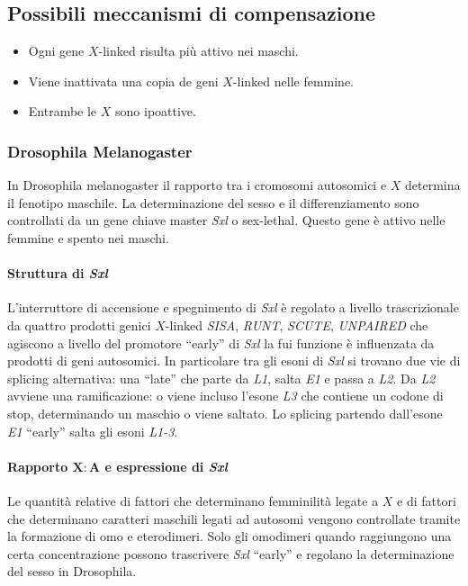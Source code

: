 	\subsection{Possibili meccanismi di compensazione}
	\begin{itemize}
		\item Ogni gene $X$-linked risulta pi\`u attivo nei maschi.
		\item Viene inattivata una copia de geni $X$-linked nelle femmine.
		\item Entrambe le $X$ sono ipoattive.
	\end{itemize}

		\subsubsection{Drosophila Melanogaster}
		In Drosophila melanogaster il rapporto tra i cromosomi autosomici e $X$ determina il fenotipo maschile.
		La determinazione del sesso e il differenziamento sono controllati da un gene chiave master \emph{Sxl} o sex-lethal.
		Questo gene \`e attivo nelle femmine e spento nei maschi.

			\paragraph{Struttura di \emph{Sxl}}
			L'interruttore di accensione e spegnimento di \emph{Sxl} \`e regolato a livello trascrizionale da quattro prodotti genici $X$-linked \emph{SISA}, \emph{RUNT}, \emph{SCUTE}, \emph{UNPAIRED} che agiscono a livello del promotore ``early'' di \emph{Sxl} la fui funzione \`e influenzata da prodotti di geni autosomici.
			In particolare tra gli esoni di \emph{Sxl} si trovano due vie di splicing alternativa: una ``late'' che parte da \emph{L1}, salta \emph{E1} e passa a \emph{L2}. 
			Da \emph{L2} avviene una ramificazione: o viene incluso l'esone \emph{L3} che contiene un codone di stop, determinando un maschio o viene saltato.
			Lo splicing partendo dall'esone \emph{E1} ``early'' salta gli esoni \emph{L1-3}.

			\paragraph{Rapporto $\mathbf{X:A}$ e espressione di \emph{Sxl}}
			Le quantit\`a relative di fattori che determinano femminilit\`a legate a $X$ e di fattori che determinano caratteri maschili legati ad autosomi vengono controllate tramite la
			formazione di omo e eterodimeri.
			Solo gli omodimeri quando raggiungono una certa concentrazione possono trascrivere \emph{Sxl} ``early'' e regolano la determinazione del sesso in Drosophila.

